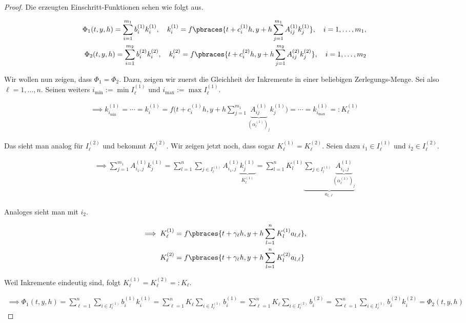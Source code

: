 \begin{proof}

Die erzeugten Einschritt-Funktionen sehen wie folgt aus.

\begin{align*}
  \Phi_1(t, y, h)
  =
  \sum_{i=1}^{m_1}
  b_i^{(1)} k_i^{(1)},
  \quad
  k_i^{(1)}
  =
  f \pbraces
  {
    t + c_i^{(1)} h,
    y + h \sum_{j=1}^{m_1} A_{i j}^{(1)} k_j^{(1)}
  },
  \quad
  i = 1, \ldots, m_1, \\
  \Phi_2(t, y, h)
  =
  \sum_{i=1}^{m_2}
  b_i^{(2)} k_i^{(2)},
  \quad
  k_i^{(2)}
  =
  f \pbraces
  {
    t + c_i^{(2)} h,
    y + h \sum_{j=1}^{m_2} A_{i j}^{(2)} k_j^{(2)}
  },
  \quad
  i = 1, \ldots, m_2
\end{align*}

Wir wollen nun zeigen, dass $\Phi_1 = \Phi_2$.
Dazu, zeigen wir zuerst die Gleichheit der Inkremente in einer beliebigen Zerlegungs-Menge.
Sei also $\ell = 1, \ldots, n$.
Seinen weiters $i_\text{min} := \min I_\ell^{(1)}$ und $i_\text{max} := \max I_\ell^{(1)}$.

\begin{align*}
  \implies
  k_{i_\text{min}}^{(1)}
  =
  \cdots
  =
  k_i^{(1)}
  =
  f \bigg(
    t + c_i^{(1)} h,
    y + h \sum_{j=1}^{m_1}
    \underbrace
    {A_{i j}^{(1)}}_{(\alpha_l^{(1)})_j}
    k_j^{(1)}
  \bigg)
  =
  \cdots
  =
  k_{i_\text{max}}^{(1)}
  =:
  K_\ell^{(1)}
\end{align*}

Das sieht man analog für $I_\ell^{(2)}$ und bekommt $K_\ell^{(2)}$.
Wir zeigen jetzt noch, dass sogar $K_\ell^{(1)} = K_\ell^{(2)}$.
Seien dazu $i_1 \in I_\ell^{(1)}$ und $i_2 \in I_\ell^{(2)}$.

\begin{align*}
  \implies
  \sum_{j=1}^{m_1} A_{i_1, j}^{(1)} k_j^{(1)}
  =
  \sum_{l=1}^n
  \sum_{j \in I_l^{(1)}}
  A_{i_1, j}^{(1)}
  \underbrace{k_j^{(1)}}_{K_l^{(1)}}
  =
  \sum_{l=1}^n
  K_l^{(1)}
  \underbrace
  {
    \sum_{j \in I_l^{(1)}}
    \underbrace{A_{i_1, j}^{(1)}}_{(\alpha_\ell^{(1)})_j}
  }_{a_{l, \ell}}
\end{align*}

Analoges sieht man mit $i_2$.

\begin{align*}
  \implies
  K_\ell^{(1)}
  & =
  f \pbraces
  {
    t + \gamma_\ell h,
    y + h \sum_{l=1}^n K_l^{(1)} a_{l, \ell}
  }, \\
  K_\ell^{(2)}
  & =
  f \pbraces
  {
    t + \gamma_\ell h,
    y + h \sum_{l=1}^n K_l^{(2)} a_{l, \ell}
  }
\end{align*}

Weil Inkremente eindeutig sind, folgt $K_\ell^{(1)} = K_\ell^{(2)} =: K_\ell$.

\begin{align*}
  \implies
  \Phi_1(t, y, h)
  =
  \sum_{\ell = 1}^n
  \sum_{i \in I_\ell^{(1)}}
  b_i^{(1)} k_i^{(1)}
  =
  \sum_{\ell = 1}^n
  K_\ell
  \sum_{i \in I_\ell^{(1)}}
  b_i^{(1)}
  =
  \sum_{\ell = 1}^n
  K_\ell
  \sum_{i \in I_\ell^{(2)}}
  b_i^{(2)}
  =
  \sum_{\ell = 1}^n
  \sum_{i \in I_\ell^{(1)}}
  b_i^{(2)} k_i^{(2)}
  =
  \Phi_2(t, y, h)
\end{align*}

\end{proof}
